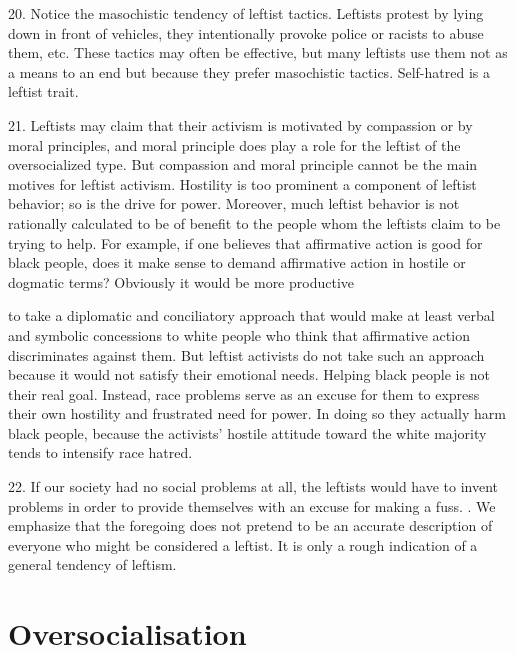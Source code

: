\documentclass{article}
\begin{document}
20.  Notice the masochistic tendency of leftist tactics.  Leftists protest by lying down in front of 
vehicles, they intentionally provoke police or racists to abuse them, etc.  These tactics may often 
be  effective,  but  many  leftists  use  them  not  as  a  means  to  an  end  but  because  they  prefer 
masochistic tactics.  Self-hatred is a leftist trait. \vspace{\baselineskip}

21.  Leftists may claim that their activism is motivated by compassion or by moral principles, and 
moral  principle  does  play  a  role  for  the  leftist  of  the  oversocialized  type.   But  compassion  and  
moral  principle  cannot  be  the  main  motives  for  leftist  activism.   Hostility  is  too  prominent  a  
component of leftist behavior; so is the drive for power.  Moreover, much leftist behavior is not 
rationally calculated to be of benefit to the people whom the leftists claim to be trying to help.  For 
example,  if  one  believes  that  affirmative  action  is  good  for  black  people,  does  it  make  sense  to  
demand affirmative action in hostile or dogmatic terms? Obviously it would be more productive 
 
to  take  a  diplomatic  and  conciliatory  approach  that  would  make  at  least  verbal  and  symbolic  
concessions  to  white  people  who  think  that  affirmative  action  discriminates  against  them.   But 
leftist  activists  do  not  take  such  an  approach  because  it  would  not  satisfy  their  emotional  
needs.  Helping black people is not their real goal.  Instead, race problems serve as an excuse for 
them to express their own hostility and frustrated need for power.  In doing so they actually harm 
black  people,  because  the  activists’  hostile  attitude  toward  the  white  majority  tends  to  intensify  
race hatred. \vspace{\baselineskip}

22.  If our society had no social problems at all, the leftists would have to invent problems in order 
to provide themselves with an excuse for making a fuss. \vspace{\baselineskip} .  We emphasize that the foregoing does not pretend to be an accurate description of everyone 
who might be considered a leftist.  It is only a rough indication of a general tendency of leftism. \vspace{\baselineskip}


\section{Oversocialisation}
\end{document}
